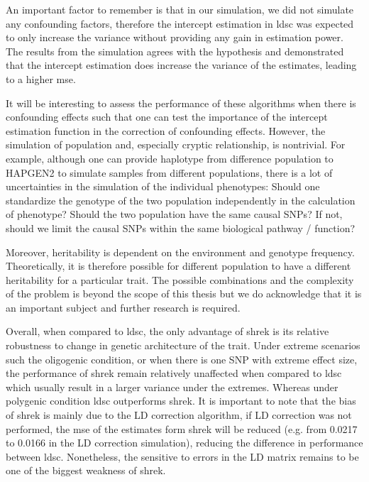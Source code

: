 	An important factor to remember is that in our simulation, we did not simulate any confounding factors, therefore the intercept estimation in \gls{ldsc} was expected to only increase the variance without providing any gain in estimation power. 
	The results from the simulation agrees with the hypothesis and demonstrated that the intercept estimation does increase the variance of the estimates, leading to a higher \gls{mse}. 
	
	It will be interesting to assess the performance of these algorithms when there is confounding effects such that one can test the importance of the intercept estimation function in the correction of confounding effects.
	However, the simulation of population and, especially cryptic relationship, is nontrivial.
	For example, although one can provide haplotype from difference population to HAPGEN2 to simulate samples from different populations, there is a lot of uncertainties in the simulation of the individual phenotypes: 
	Should one standardize the genotype of the two population independently in the calculation of phenotype? 
	Should the two population have the same causal \glspl{SNP}?
	If not, should we limit the causal \glspl{SNP} within the same biological pathway / function?
	
	Moreover, heritability is dependent on the environment and genotype frequency. 
	Theoretically, it is therefore possible for different population to have a different heritability for a particular trait.
	The possible combinations and the complexity of the problem is beyond the scope of this thesis but we do acknowledge that it is an important subject and further research is required.
	
	Overall, when compared to \gls{ldsc}, the only advantage of \gls{shrek} is its relative robustness to change in genetic architecture of the trait.
	Under extreme scenarios such the oligogenic condition, or when there is one \gls{SNP} with extreme effect size, the performance of \gls{shrek} remain relatively unaffected when compared to \gls{ldsc} which usually result in a larger variance under the extremes. 
	Whereas under polygenic condition \gls{ldsc} outperforms \gls{shrek}.
	It is important to note that the bias of \gls{shrek} is mainly due to the \gls{LD} correction algorithm, if \gls{LD} correction was not performed, the \gls{mse} of the estimates form \gls{shrek} will be reduced (e.g. from 0.0217 to 0.0166 in the \gls{LD} correction simulation), reducing the difference in performance between \gls{ldsc}.
	Nonetheless, the sensitive to errors in the \gls{LD} matrix remains to be one of the biggest weakness of \gls{shrek}.
	
